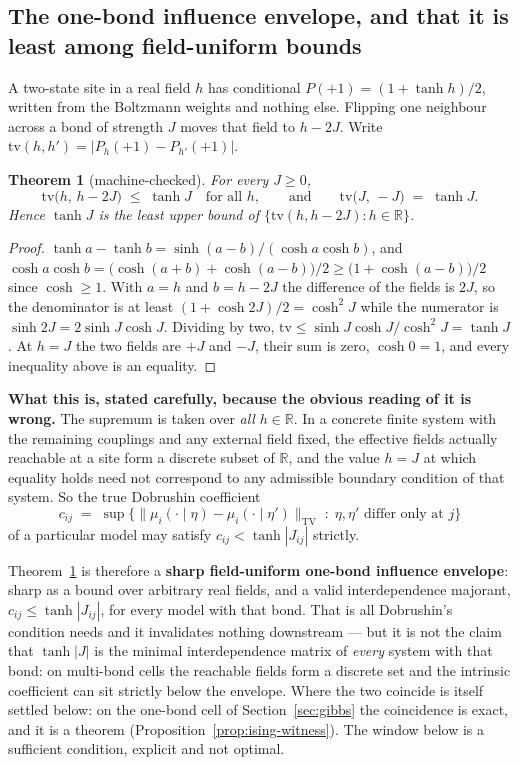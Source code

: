 \documentclass[11pt]{article}
\newtheorem{theorem}{Theorem}[section]
\theoremstyle{definition}
\newcommand{\R}{\mathbb{R}}
\begin{document}
\subsection{The one-bond influence envelope, and that it is least among
field-uniform bounds}

A two-state site in a real field $h$ has conditional $P(+1)=(1+\tanh h)/2$,
written from the Boltzmann weights and nothing else.  Flipping one neighbour
across a bond of strength $J$ moves that field to $h-2J$.  Write
$\mathrm{tv}(h,h')=|P_h(+1)-P_{h'}(+1)|$.

\begin{theorem}[machine-checked]
\label{thm:coeff}
For every $J\ge0$,
\[
  \mathrm{tv}\bigl(h,\,h-2J\bigr)\;\le\;\tanh J \quad\text{for all }h,
  \qquad\text{and}\qquad
  \mathrm{tv}\bigl(J,\,-J\bigr)\;=\;\tanh J .
\]
Hence $\tanh J$ is the \emph{least} upper bound of
$\{\mathrm{tv}(h,h-2J):h\in\R\}$.
\end{theorem}

\begin{proof}
$\tanh a-\tanh b=\sinh(a-b)/(\cosh a\cosh b)$, and
$\cosh a\cosh b=\bigl(\cosh(a+b)+\cosh(a-b)\bigr)/2\ge\bigl(1+\cosh(a-b)\bigr)/2$
since $\cosh\ge1$.  With $a=h$ and $b=h-2J$ the difference of the fields is
$2J$, so the denominator is at least $(1+\cosh 2J)/2=\cosh^2 J$ while the
numerator is $\sinh 2J=2\sinh J\cosh J$.  Dividing by two,
$\mathrm{tv}\le\sinh J\cosh J/\cosh^2 J=\tanh J$.  At $h=J$ the two fields are
$+J$ and $-J$, their sum is zero, $\cosh 0=1$, and every inequality above is an
equality.
\end{proof}

\textbf{What this is, stated carefully, because the obvious reading of it is
wrong.}  The supremum is taken over \emph{all} $h\in\R$.  In a concrete finite
system with the remaining couplings and any external field fixed, the effective
fields actually reachable at a site form a discrete subset of $\R$, and the value
$h=J$ at which equality holds need not correspond to any admissible boundary
condition of that system.  So the true Dobrushin coefficient
\[
  c_{ij}\;=\;\sup\bigl\{\|\mu_i(\cdot\mid\eta)-\mu_i(\cdot\mid\eta')\|_{\mathrm{TV}}
  \;:\;\eta,\eta'\text{ differ only at }j\bigr\}
\]
of a particular model may satisfy $c_{ij}<\tanh|J_{ij}|$ strictly.

Theorem~\ref{thm:coeff} is therefore a \textbf{sharp field-uniform one-bond
influence envelope}: sharp as a bound over arbitrary real fields, and a valid
interdependence majorant, $c_{ij}\le\tanh|J_{ij}|$, for every model with that
bond.  That is all Dobrushin's condition needs and it invalidates nothing
downstream --- but it is not the claim that $\tanh|J|$ is the minimal
interdependence matrix of \emph{every} system with that bond: on multi-bond
cells the reachable fields form a discrete set and the intrinsic coefficient
can sit strictly below the envelope.  Where the two coincide is itself
settled below: on the one-bond cell of Section~\ref{sec:gibbs} the
coincidence is exact, and it is a theorem
(Proposition~\ref{prop:ising-witness}).  The window below is a sufficient
condition, explicit and not optimal.
\end{document}
